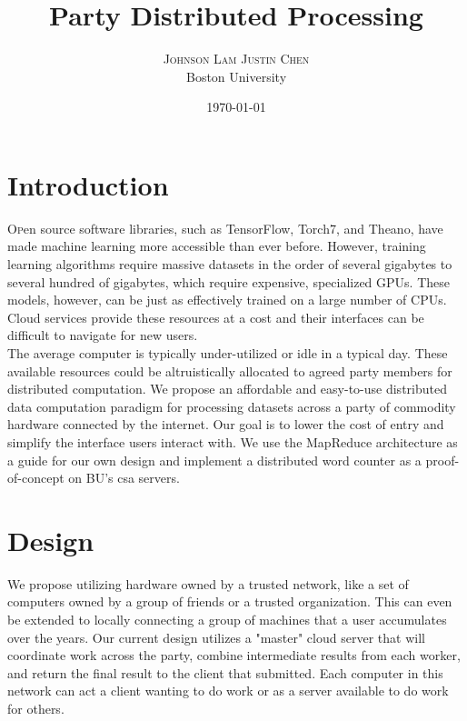 \documentclass[twoside]{article}
\title{Party Distributed Processing} %
\author{%
\textsc{Johnson Lam \qquad Justin Chen} \\[1ex] %
\normalsize Boston University \\ %
}
\date{\today} %
\begin{document}
\maketitle

\section{Introduction}
\lettrine[nindent=0em,lines=3] Open source software libraries, such as TensorFlow, Torch7, and Theano, have made machine learning more accessible than ever before. However, training learning algorithms require massive datasets in the order of several gigabytes to several hundred of gigabytes, which require expensive, specialized GPUs. These models, however, can be just as effectively trained on a large number of CPUs. Cloud services provide these resources at a cost and their interfaces can be
difficult to navigate for new users. \\

The average computer is typically under-utilized or idle in a typical day. These available resources could be altruistically allocated to agreed party members for distributed computation. We propose an affordable and easy-to-use distributed data computation paradigm for processing datasets across a party of commodity hardware connected by the internet. Our goal is to lower the cost of entry and simplify the interface users interact with. We use the MapReduce
\cite{mapreduce} architecture as a guide for our own
design and implement a distributed word counter as a proof-of-concept on BU's csa servers.

\section{Design}
We propose utilizing hardware owned by a trusted network, like a set of computers owned by a group of friends or a trusted organization. This can even be extended to locally connecting a group of machines that a user accumulates over the years. Our current design utilizes a "master" cloud server that will coordinate work across the party, combine intermediate results from each worker, and return the final result to the client that submitted. Each computer in this network can act a client
wanting to do work or as a server available to do work for others. \\
\end{document}
